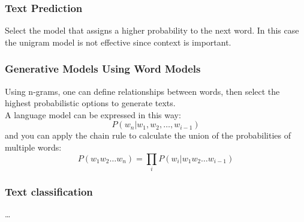 \subsubsection{Text Prediction}
Select the model that assigns a higher probability to the next word.
In this case the unigram model is not effective since context is important.

\subsubsection{Generative Models Using Word Models}
Using n-grams, one can define relationships between words, then select the highest probabilistic options to generate texts. \\
\vspace{1em}
A language model can be expressed in this way:
\begin{equation} \tag*{}
    P(w_n | w_1, w_2, \ldots, w_{i-1})
\end{equation}
and you can apply the chain rule to calculate the union of the probabilities of multiple words:
\begin{equation} \tag*{}
    P(w_1 w_2 \dots w_n) = \prod_i P(w_i | w_1 w_2 \ldots w_{i-1})
\end{equation}

\subsubsection{Text classification}
\ldots

\newpage